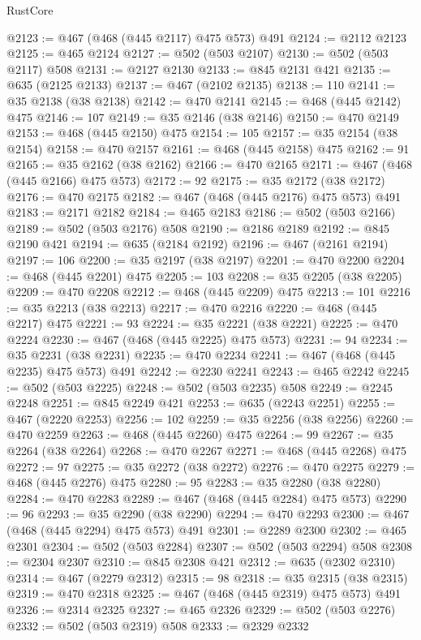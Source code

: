 \begin{lexlean}{RustCore}
\begin{coremodule}
@2123 := @467 (@468 (@445 @2117) @475 @573) @491
@2124 := @2112 @2123
@2125 := @465 @2124
@2127 := @502 (@503 @2107)
@2130 := @502 (@503 @2117) @508
@2131 := @2127 @2130
@2133 := @845 @2131 @421
@2135 := @635 (@2125 @2133)
@2137 := @467 (@2102 @2135)
@2138 := 110
@2141 := @35 @2138 (@38 @2138)
@2142 := @470 @2141
@2145 := @468 (@445 @2142) @475
@2146 := 107
@2149 := @35 @2146 (@38 @2146)
@2150 := @470 @2149
@2153 := @468 (@445 @2150) @475
@2154 := 105
@2157 := @35 @2154 (@38 @2154)
@2158 := @470 @2157
@2161 := @468 (@445 @2158) @475
@2162 := 91
@2165 := @35 @2162 (@38 @2162)
@2166 := @470 @2165
@2171 := @467 (@468 (@445 @2166) @475 @573)
@2172 := 92
@2175 := @35 @2172 (@38 @2172)
@2176 := @470 @2175
@2182 := @467 (@468 (@445 @2176) @475 @573) @491
@2183 := @2171 @2182
@2184 := @465 @2183
@2186 := @502 (@503 @2166)
@2189 := @502 (@503 @2176) @508
@2190 := @2186 @2189
@2192 := @845 @2190 @421
@2194 := @635 (@2184 @2192)
@2196 := @467 (@2161 @2194)
@2197 := 106
@2200 := @35 @2197 (@38 @2197)
@2201 := @470 @2200
@2204 := @468 (@445 @2201) @475
@2205 := 103
@2208 := @35 @2205 (@38 @2205)
@2209 := @470 @2208
@2212 := @468 (@445 @2209) @475
@2213 := 101
@2216 := @35 @2213 (@38 @2213)
@2217 := @470 @2216
@2220 := @468 (@445 @2217) @475
@2221 := 93
@2224 := @35 @2221 (@38 @2221)
@2225 := @470 @2224
@2230 := @467 (@468 (@445 @2225) @475 @573)
@2231 := 94
@2234 := @35 @2231 (@38 @2231)
@2235 := @470 @2234
@2241 := @467 (@468 (@445 @2235) @475 @573) @491
@2242 := @2230 @2241
@2243 := @465 @2242
@2245 := @502 (@503 @2225)
@2248 := @502 (@503 @2235) @508
@2249 := @2245 @2248
@2251 := @845 @2249 @421
@2253 := @635 (@2243 @2251)
@2255 := @467 (@2220 @2253)
@2256 := 102
@2259 := @35 @2256 (@38 @2256)
@2260 := @470 @2259
@2263 := @468 (@445 @2260) @475
@2264 := 99
@2267 := @35 @2264 (@38 @2264)
@2268 := @470 @2267
@2271 := @468 (@445 @2268) @475
@2272 := 97
@2275 := @35 @2272 (@38 @2272)
@2276 := @470 @2275
@2279 := @468 (@445 @2276) @475
@2280 := 95
@2283 := @35 @2280 (@38 @2280)
@2284 := @470 @2283
@2289 := @467 (@468 (@445 @2284) @475 @573)
@2290 := 96
@2293 := @35 @2290 (@38 @2290)
@2294 := @470 @2293
@2300 := @467 (@468 (@445 @2294) @475 @573) @491
@2301 := @2289 @2300
@2302 := @465 @2301
@2304 := @502 (@503 @2284)
@2307 := @502 (@503 @2294) @508
@2308 := @2304 @2307
@2310 := @845 @2308 @421
@2312 := @635 (@2302 @2310)
@2314 := @467 (@2279 @2312)
@2315 := 98
@2318 := @35 @2315 (@38 @2315)
@2319 := @470 @2318
@2325 := @467 (@468 (@445 @2319) @475 @573) @491
@2326 := @2314 @2325
@2327 := @465 @2326
@2329 := @502 (@503 @2276)
@2332 := @502 (@503 @2319) @508
@2333 := @2329 @2332

\end{coremodule}
\end{lexlean}
